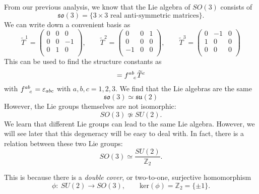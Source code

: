 \begin{example}[G = SO(3)]
  From our previous analysis, we know that the Lie algebra of $SO(3)$ consists of
  \begin{equation}
    \mathfrak{so}(3) = \{ 3 \times 3 \text{ real anti-symmetric matrices} \}.
  \end{equation}
  We can write down a convenient basis as
  \begin{equation}
    \widetilde T^1 = 
    \begin{pmatrix}
     0 & 0 & 0 \\
     0 & 0 & -1 \\
     0 & 1 & 0 \\
    \end{pmatrix},
    \qquad
    \widetilde T^2 = 
    \begin{pmatrix}
     0 & 0 & 1 \\
     0 & 0 & 0 \\
     -1 & 0 & 0 \\
    \end{pmatrix},
    \qquad
    \widetilde T^3 = 
    \begin{pmatrix}
     0 & -1 & 0 \\
     1 & 0 & 0 \\
     0 & 0 & 0 \\
    \end{pmatrix}
  \end{equation}
  This can be used to find the structure constants as
  \begin{equation}
    [\widetilde T^a, \widetilde T^b] = f \indices{^{ab}_c} \widetilde T^c
  \end{equation}
  with $f \indices{^{ab}_c} = \varepsilon_{abc}$ with $a,b,c = 1,2,3$.
  We find that the Lie algebras are the same
  \begin{equation}
    \mathfrak{so}(3) \simeq \mathfrak{su}(2)
  \end{equation}
  However, the Lie groups themselves are not isomorphic: 
  \begin{equation}
    SO(3) \not\simeq SU(2).
  \end{equation}
  We learn that different Lie groups can lead to the same Lie algebra. However, we will see later that this degeneracy will be easy to deal with.
  In fact, there is a relation between these two Lie groups:
  \begin{equation}
    SO(3) \simeq \frac{SU(2)}{\mathbb{Z}_2}.
  \end{equation}
  \begin{leftbar}
    \begin{remark}
      This is because there is a \emph{double cover}, or two-to-one, surjective homomorphism
      \begin{equation}
	\phi\colon \ SU(2) \to SO(3), \qquad \text{ker}(\phi) = \mathbb{Z}_2 = \{\pm 1\}.
      \end{equation}
    \end{remark}
  \end{leftbar}
\end{example}

